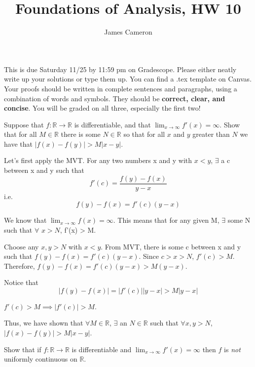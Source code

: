\documentclass[answers]{exam}
\title{Foundations of Analysis, HW 10}
\author{James Cameron}
\date{}
\theoremstyle{remark}
\theoremstyle{definition}
\newcommand{\RR}{\mathbb{R}}
\begin{document}



 This is due Saturday 11/25 by 11:59 pm on Gradescope. Please either neatly write up your solutions or type them up. You can find a .tex template on Canvas. Your proofs should be written in complete sentences and paragraphs, using a combination of words and symbols. They should be \textbf{correct, clear, and concise}. You will be graded on all three, especially the first two!

\noindent


\begin{questions}

\question[4] Suppose that $f: \RR \to \RR$ is differentiable, and that $\lim_{x \to \infty} f'(x)= \infty$. Show that for all $M \in \RR$ there is some $N \in \RR$ so that for all $x$ and $y$ greater than $N$ we have that $|f(x)-f(y)|> M|x-y|$.

\begin{solution}

Let's first apply the MVT. For any two numbers x and y
with $x < y$, $\exists$ a c between x and y such that
\[f'(c) = \frac{f(y) - f(x)}{y - x}\]
i.e.
\[f(y) - f(x) = f'(c)(y - x)\]

We know that $\lim_{x \to \infty} f(x) = \infty$. This means that
for any given M, $\exists$ some N such that $\forall$ $x > N$,
f'(x) > M.

Choose any $x, y > N$ with $x < y$. From MVT, there is some c
between x and y such that $f(y) - f(x) = f'(c)(y - x)$.
Since $c > x > N$, $f'(c) > M$. Therefore,
$f(y) - f(x) = f'(c)(y - x) > M(y - x)$.

Notice that
\[|f(y) - f(x)| = |f'(c)||y-x| > M|y-x|\]

$f'(c) > M \implies |f'(c)| > M$.

Thus, we have shown that $\forall M \in \RR$, $\exists$ an $N \in \RR$
such that $\forall x, y > N$, $|f(x) - f(y)| > M|x-y|$.

\end{solution}

\question[4] Show that if $f: \RR \to \RR$ is differentiable and $\lim_{x \to \infty} f'(x)= \infty$ then $f$ is \emph{not} uniformly continuous on $\RR$.
\begin{solution}


\end{solution}
\end{questions}
\end{document}
